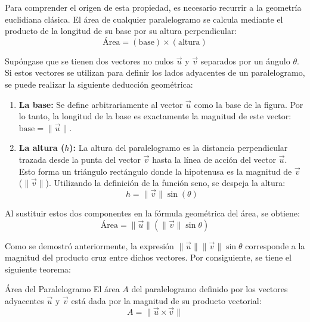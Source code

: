 Para comprender el origen de esta propiedad, es necesario recurrir a la geometría euclidiana clásica. El área de cualquier paralelogramo se calcula mediante el producto de la longitud de su base por su altura perpendicular:
\[ \text{Área} = (\text{base}) \times (\text{altura}) \]

Supóngase que se tienen dos vectores no nulos $\vec{u}$ y $\vec{v}$ separados por un ángulo $\theta$. Si estos vectores se utilizan para definir los lados adyacentes de un paralelogramo, se puede realizar la siguiente deducción geométrica:

\begin{enumerate}
    \item \textbf{La base:} Se define arbitrariamente al vector $\vec{u}$ como la base de la figura. Por lo tanto, la longitud de la base es exactamente la magnitud de este vector: $\text{base} = \|\vec{u}\|$.
    \item \textbf{La altura ($h$):} La altura del paralelogramo es la distancia perpendicular trazada desde la punta del vector $\vec{v}$ hasta la línea de acción del vector $\vec{u}$. Esto forma un triángulo rectángulo donde la hipotenusa es la magnitud de $\vec{v}$ ($\|\vec{v}\|$). Utilizando la definición de la función seno, se despeja la altura:
    \[ h = \|\vec{v}\| \sin(\theta) \]
\end{enumerate}

Al sustituir estos dos componentes en la fórmula geométrica del área, se obtiene:
\[ \text{Área} = \|\vec{u}\| (\|\vec{v}\| \sin\theta) \]

Como se demostró anteriormente, la expresión $\|\vec{u}\| \|\vec{v}\| \sin\theta$ corresponde a la magnitud del producto cruz entre dichos vectores. Por consiguiente, se tiene el siguiente teorema:

\begin{mytheorem}{Área del Paralelogramo}
El área $A$ del paralelogramo definido por los vectores adyacentes $\vec{u}$ y $\vec{v}$ está dada por la magnitud de su producto vectorial:
\[ A = \|\vec{u} \times \vec{v}\| \]
\end{mytheorem}


